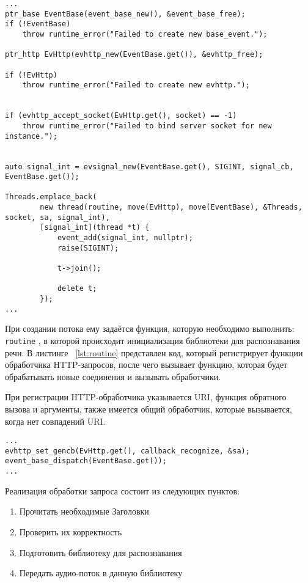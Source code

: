 \begin{lstlisting}[caption={Пример создания нескольких потоков обслуживания}, label={lst:ev:thread}]
...
ptr_base EventBase(event_base_new(), &event_base_free);
if (!EventBase)
    throw runtime_error("Failed to create new base_event.");

ptr_http EvHttp(evhttp_new(EventBase.get()), &evhttp_free);

if (!EvHttp)
    throw runtime_error("Failed to create new evhttp.");


if (evhttp_accept_socket(EvHttp.get(), socket) == -1)
    throw runtime_error("Failed to bind server socket for new instance.");


auto signal_int = evsignal_new(EventBase.get(), SIGINT, signal_cb, EventBase.get());

Threads.emplace_back(
        new thread(routine, move(EvHttp), move(EventBase), &Threads, socket, sa, signal_int),
        [signal_int](thread *t) {
            event_add(signal_int, nullptr);
            raise(SIGINT);

            t->join();

            delete t;
        });
...
\end{lstlisting}

При создании потока ему задаётся функция, которую необходимо выполнить: \texttt{routine}
, в которой происходит инициализация библиотеки для распознавания речи. В листинге~
\ref{lst:routine} представлен код, который регистрирует функции обработчика HTTP-запросов,
после чего вызывает функцию, которая будет обрабатывать новые соединения и вызывать
обработчики.

При регистрации HTTP-обработчика указывается URI, функция обратного вызова и аргументы,
также имеется общий обработчик, которые вызывается, когда нет совпадений URI.

\begin{lstlisting}[caption={Инициализация обработчиков}, label={lst:routine}]
...
evhttp_set_gencb(EvHttp.get(), callback_recognize, &sa);
event_base_dispatch(EventBase.get());
...
\end{lstlisting}

Реализация обработки запроса состоит из следующих пунктов:
\begin{enumerate}
    \item Прочитать необходимые Заголовки
    \item Проверить их корректность
    \item Подготовить библиотеку для распознавания
    \item Передать аудио-поток в данную библиотеку
\end{enumerate}

